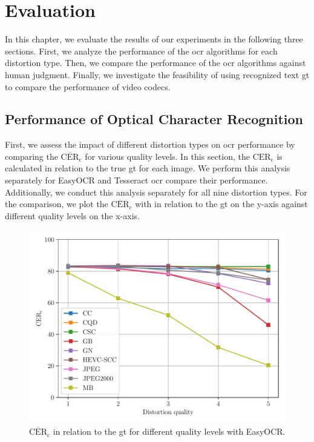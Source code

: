\chapter{Evaluation}
\label{chap:evaluation}

In this chapter, we evaluate the results of our experiments in the following three sections.
First, we analyze the performance of the \gls{ocr} algorithms for each distortion type.
Then, we compare the performance of the \gls{ocr} algorithms against human judgment.
Finally, we investigate the feasibility of using recognized text \gls{gt} to compare the performance of video codecs.

\section{Performance of Optical Character Recognition}
\label{sec:ocr_performance}

First, we assess the impact of different distortion types on \gls{ocr} performance by comparing the $\overline{\text{CER}}_{\text{c}}$ for various quality levels.
In this section, the $\text{CER}_{\text{c}}$ is calculated in relation to the true \gls{gt} for each image.
We perform this analysis separately for EasyOCR and Tesseract \gls{ocr} compare their performance.
Additionally, we conduct this analysis separately for all nine distortion types.
For the comparison, we plot the $\overline{\text{CER}}_{c}$ with in relation to the \gls{gt} on the y-axis against different quality levels on the x-axis.

\begin{figure}[h!]
\centering
    \includegraphics[width=\textwidth]{../../images/analyze/cer_dist_quality_gt_ezocr.pdf}
    \caption{$\overline{\text{CER}}_{\text{c}}$ in relation to the \gls{gt} for different quality levels with EasyOCR.}
\label{fig:cer_dist_quality_gt_ezocr}
\end{figure}


